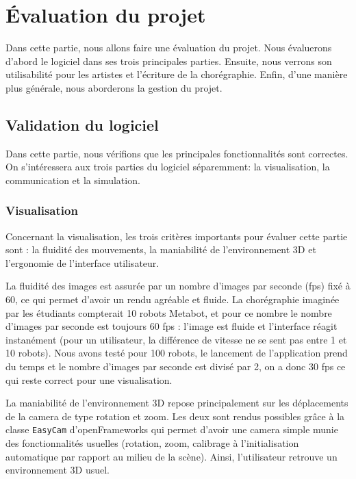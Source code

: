 \section{Évaluation du projet}

Dans cette partie, nous allons faire une évaluation du projet. Nous évaluerons d'abord le logiciel dans ses trois principales parties. Ensuite, nous verrons son utilisabilité pour les artistes et l'écriture de la chorégraphie. Enfin, d'une manière plus générale, nous aborderons la gestion du projet. 

\subsection{Validation du logiciel} %

Dans cette partie, nous vérifions que les principales fonctionnalités sont correctes. On s'intéressera aux trois parties du logiciel séparemment: la visualisation, la communication et la simulation. 

\subsubsection{Visualisation}

Concernant la visualisation, les trois critères importants pour évaluer cette partie sont : la fluidité des mouvements, la maniabilité de l'environnement 3D et l'ergonomie de l'interface utilisateur. 

La fluidité des images est assurée par un nombre d'images par seconde (fps) fixé à 60, ce qui permet d'avoir un rendu agréable et fluide. La chorégraphie imaginée par les étudiants compterait 10 robots Metabot, et pour ce nombre le nombre d'images par seconde est toujours 60 fps : l'image est fluide et l'interface réagit instanément (pour un utilisateur, la différence de vitesse ne se sent pas entre 1 et 10 robots).
Nous avons testé pour 100 robots, le lancement de l'application prend du temps et le nombre d'images par seconde est divisé par 2, on a donc 30 fps ce qui reste correct pour une visualisation. 

La maniabilité de l'environnement 3D repose principalement sur les déplacements de la camera de type rotation et zoom. Les deux sont rendus possibles grâce à la classe \verb|EasyCam| d'openFrameworks qui permet d'avoir une camera simple munie des fonctionnalités usuelles (rotation, zoom, calibrage à l'initialisation automatique par rapport au milieu de la scène). Ainsi, l'utilisateur retrouve un environnement 3D usuel.

